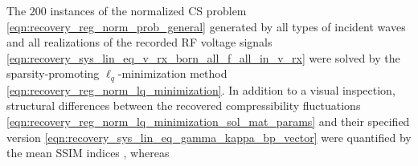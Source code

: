 The $\num{200}$ instances of
the normalized \ac{CS} problem
\eqref{eqn:recovery_reg_norm_prob_general} generated by
all types of
incident waves and
all realizations of
the recorded \ac{RF} voltage signals
\eqref{eqn:recovery_sys_lin_eq_v_rx_born_all_f_all_in_v_rx} were solved by
the sparsity-promoting $\ell_{q}$-minimization method
\eqref{eqn:recovery_reg_norm_lq_minimization}.
In addition to
a visual inspection,
structural differences between
the recovered compressibility fluctuations
\eqref{eqn:recovery_reg_norm_lq_minimization_sol_mat_params} and
their specified version
\eqref{eqn:recovery_sys_lin_eq_gamma_kappa_bp_vector} were quantified by
the mean \ac{SSIM} indices
\cite[(2)]{article:WangISPM2009}, whereas
